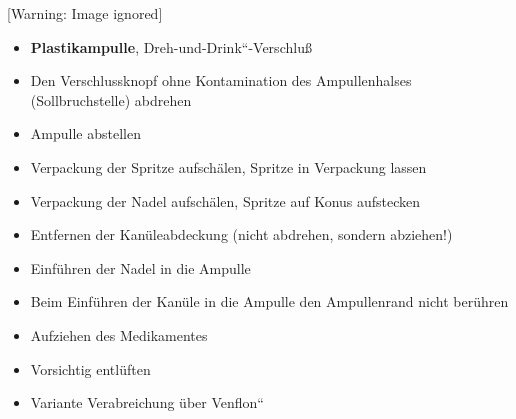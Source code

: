 \documentclass{article}
\begin{document}
\begin{center}
 [Warning: Image ignored] %

\end{center}
\begin{itemize}
\item {\mdseries
\textbf{Plastikampulle},
{\quotedblbase}Dreh-und-Drink{\textquotedblleft}-Verschlu{\ss}}

\end{itemize}
\begin{itemize}
\item {\mdseries
Den Verschlussknopf ohne Kontamination des Ampullenhalses
(Sollbruchstelle) abdrehen}

\end{itemize}
\begin{itemize}
\item {\mdseries
Ampulle abstellen}

\end{itemize}
\begin{itemize}
\item {\mdseries
Verpackung der Spritze aufsch\"alen, Spritze in Verpackung lassen}

\item {\mdseries
Verpackung der Nadel aufsch\"alen, Spritze auf Konus aufstecken}

\item {\mdseries
Entfernen der Kan\"uleabdeckung (nicht abdrehen, sondern abziehen!)}

\item {\mdseries
Einf\"uhren der Nadel in die Ampulle}

\end{itemize}
\begin{itemize}
\item {\mdseries
Beim Einf\"uhren der Kan\"ule in die Ampulle den Ampullenrand nicht
ber\"uhren}

\end{itemize}
\begin{itemize}
\item {\mdseries
Aufziehen des Medikamentes}

\item {\mdseries
Vorsichtig entl\"uften}

\item {\mdseries
Variante {\quotedblbase}Verabreichung \"uber Venflon{\textquotedblleft}
}

\end{itemize}
\end{document}
